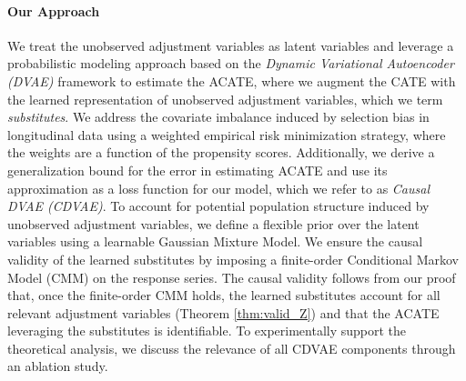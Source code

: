 \documentclass[10pt]{article} %
\begin{document}
\paragraph{Our Approach}  
We treat the unobserved adjustment variables as latent variables and leverage a probabilistic modeling approach based on the \emph{Dynamic Variational Autoencoder (DVAE)} framework \citep{Girin2021DynamicalVAReview} to estimate the ACATE, where we augment the CATE with the learned representation of unobserved adjustment variables, which we term \emph{substitutes}. We address the covariate imbalance induced by selection bias in longitudinal data using a weighted empirical risk minimization strategy, where the weights are a function of the propensity scores. Additionally, we derive a generalization bound for the error in estimating ACATE and use its approximation as a loss function for our model, which we refer to as \emph{Causal DVAE (CDVAE)}. To account for potential population structure induced by unobserved adjustment variables, we define a flexible prior over the latent variables using a learnable Gaussian Mixture Model. We ensure the causal validity of the learned substitutes by imposing a finite-order Conditional Markov Model (CMM) on the response series. The causal validity follows from our proof that, once the finite-order CMM holds, the learned substitutes account for all relevant adjustment variables (Theorem \ref{thm:valid_Z}) and that the ACATE leveraging the substitutes is identifiable. To experimentally support the theoretical analysis, we discuss the relevance of all CDVAE components through an ablation study. 
\end{document}
